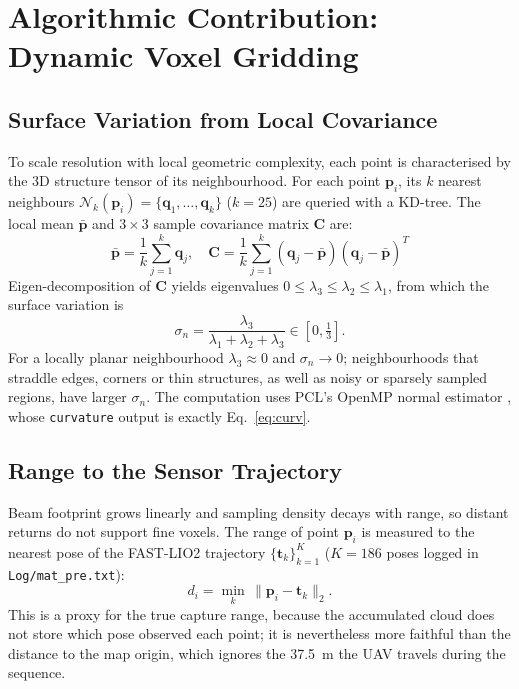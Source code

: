 \documentclass[11pt,a4paper]{report}
\begin{document}
\newpage

\chapter{Algorithmic Contribution: Dynamic Voxel Gridding}

\section{Surface Variation from Local Covariance}
To scale resolution with local geometric complexity, each point is characterised by the 3D structure tensor of its neighbourhood. For each point $\mathbf{p}_i$, its $k$ nearest neighbours $\mathcal{N}_k(\mathbf{p}_i) = \{\mathbf{q}_1, \dots, \mathbf{q}_k\}$ ($k=25$) are queried with a KD-tree. The local mean $\bar{\mathbf{p}}$ and $3 \times 3$ sample covariance matrix $\mathbf{C}$ are:
\begin{equation}
    \bar{\mathbf{p}} = \frac{1}{k} \sum_{j=1}^k \mathbf{q}_j, \quad \mathbf{C} = \frac{1}{k} \sum_{j=1}^k (\mathbf{q}_j - \bar{\mathbf{p}})(\mathbf{q}_j - \bar{\mathbf{p}})^T
\end{equation}
Eigen-decomposition of $\mathbf{C}$ yields eigenvalues $0 \le \lambda_3 \le \lambda_2 \le \lambda_1$, from which the surface variation is
\begin{equation}
    \sigma_n = \frac{\lambda_3}{\lambda_1 + \lambda_2 + \lambda_3} \in \left[ 0, \tfrac{1}{3} \right]. \label{eq:curv}
\end{equation}
For a locally planar neighbourhood $\lambda_3 \approx 0$ and $\sigma_n \to 0$; neighbourhoods that straddle edges, corners or thin structures, as well as noisy or sparsely sampled regions, have larger $\sigma_n$. The computation uses PCL's OpenMP normal estimator \cite{rusu2011pcl}, whose \texttt{curvature} output is exactly Eq.~\eqref{eq:curv}.

\section{Range to the Sensor Trajectory}
Beam footprint grows linearly and sampling density decays with range, so distant returns do not support fine voxels. The range of point $\mathbf{p}_i$ is measured to the nearest pose of the FAST-LIO2 trajectory $\{\mathbf{t}_k\}_{k=1}^{K}$ ($K = 186$ poses logged in \texttt{Log/mat\_pre.txt}):
\begin{equation}
    d_i = \min_{k} \, \| \mathbf{p}_i - \mathbf{t}_k \|_2 .
\end{equation}
This is a proxy for the true capture range, because the accumulated cloud does not store which pose observed each point; it is nevertheless more faithful than the distance to the map origin, which ignores the 37.5~m the UAV travels during the sequence.
\end{document}
